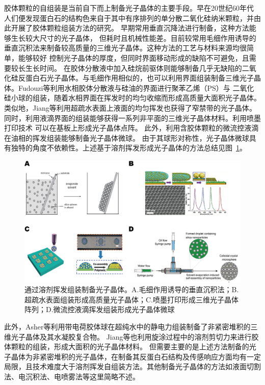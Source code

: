 胶体颗粒的自组装是当前自下而上制备光子晶体的主要手段。早在20世纪60年代
人们便发现蛋白石的结构色来自于其中有序排列的单分散二氧化硅纳米颗粒\cite{Darragh1966Origin,Iler1965Formation}，并由此开展了胶体颗粒组装方法的研究。
早期常用垂直沉降法进行制备\cite{Darragh1970Opaline}，这种方法能够生长较大尺寸的光子晶体，
但耗时且机械性能差。目前较常用毛细作用诱导的垂直沉积法来制备较高质量的三维光子晶体\cite{Jiang1999SingleCrystal}。这种方法的工艺与材料来源均很简单，能够较好
控制光子晶体的厚度，但同时界面移动形成的缺陷不可避免，且需要较长生长时间。
在胶体分散液中加入硅烷前驱体则能够制备几乎无缺陷的二氧化硅反蛋白石光子晶体\cite{Hatton2010Assembly}。与毛细作用相似的，也可以利用界面组装制备三维光子晶体。Fudouzi等利用水相胶体分散液与硅油的界面进行聚苯乙烯（PS）与
二氧化硅小球的组装\cite{Fudouzi2004Fabricating,Fudouzi2007Novel}，随着水相界面在挥发时的均匀收缩而形成高质量大面积光子晶体。类似地，Jiang等利用超疏水表面上液面的均匀挥发也获得了窄禁带的光子晶体\cite{Huang2012Colloidal}。
同时，利用液滴界面的组装能够获得一系列非平面的三维光子晶体材料。利用喷墨打印技术
可以在基板上形成光子晶体点阵\cite{Cui2009Fabrication,Wang2012Inkjet}。
此外，利用含胶体颗粒的微流控液滴在油相的挥发组装能够制备光子晶体微球\cite{Sun2008Fabrication,Zhao2014Spherical}。
由于其球形对称性，光子晶体微球具有独特的角度不依赖性\cite{Gu2013Tailoring}。上述基于溶剂挥发形成光子晶体的方法总结见图~\ref{fig:evap_opal}。
\begin{figure}[htbp]
	\centering
	\includegraphics[width=0.8\linewidth]{figures/evap-opal.png}
	\caption{通过溶剂挥发组装制备光子晶体。A.毛细作用诱导的垂直沉积法\cite{Norris2004Opaline}；B.超疏水表面组装形成高质量光子晶体\cite{Huang2012Colloidal}；C.喷墨打印形成三维光子晶体阵列\cite{Wang2012Inkjet}；D.微流控液滴挥发组装形成光子晶体微球\cite{Cui2014Inverse}}
	\label{fig:evap_opal}
\end{figure}

此外，Asher等利用带电荷胶体球在超纯水中的静电力组装制备了非紧密堆积的三维光子晶体及其水凝胶复合物\cite{Lee2000Photonic,Muscatello2008PolyVinyl}。
Jiang等也利用旋涂过程中的溶剂剪切力来进行胶体颗粒的组装，形成大面积的光子晶体材料\cite{Jiang2004LargeScale}。
但需要主要的是上述方法制备的光子晶体为非紧密堆积的光子晶体，在制备其反蛋白石结构及传感响应方面均有一定局限，且技术难度大于溶剂挥发自组装方法。其他制备光子晶体的方法如液面切割法\cite{Yang2010LargeScale}、电沉积法\cite{Arpin2011Electrodeposited}、电喷雾法\cite{Shen2010Fabrication}等这里简略不述。


